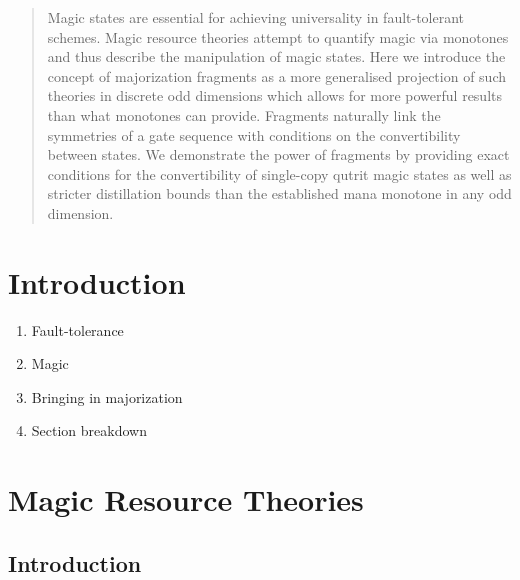 \documentclass[pra,
aps,
twocolumn,
superscriptaddress,
groupedaddress,
nofootinbib,
reprint
]{revtex4-1}
\begin{document}
\begin{abstract}
Magic states are essential for achieving universality in fault-tolerant schemes.
Magic resource theories attempt to quantify magic via monotones and thus describe the manipulation of magic states.
Here we introduce the concept of majorization fragments as a more generalised projection of such theories in discrete odd dimensions which allows for more powerful results than what monotones can provide.
Fragments naturally link the symmetries of a gate sequence with conditions on the convertibility between states.
We demonstrate the power of fragments by providing exact conditions for the convertibility of single-copy qutrit magic states as well as stricter distillation bounds than the established mana monotone in any odd dimension.
\end{abstract}


\maketitle


\section{Introduction}
\label{sec:intro}

\begin{enumerate}
    \item Fault-tolerance~\cite{cit:raussendorf, cit:gross2, cit:markov, cit:gross, cit:nest, cit:nest2, cit:vidal, cit:fujii, cit:gottesman}
    \item Magic~\cite{cit:veitch, cit:veitch2, cit:wang, cit:wang2, cit:howard, cit:campbell, cit:gross3, cit:gross4}
    \item Bringing in majorization~\cite{cit:cwiklinski, cit:lostaglio2, cit:lostaglio, cit:gour, cit:janzing, cit:brandao2, cit:gour2, cit:marshall, cit:nielsen}
    \item Section breakdown
\end{enumerate}


\section{Magic Resource Theories}
\label{sec:magic}

\subsection{Introduction}
\end{document}
